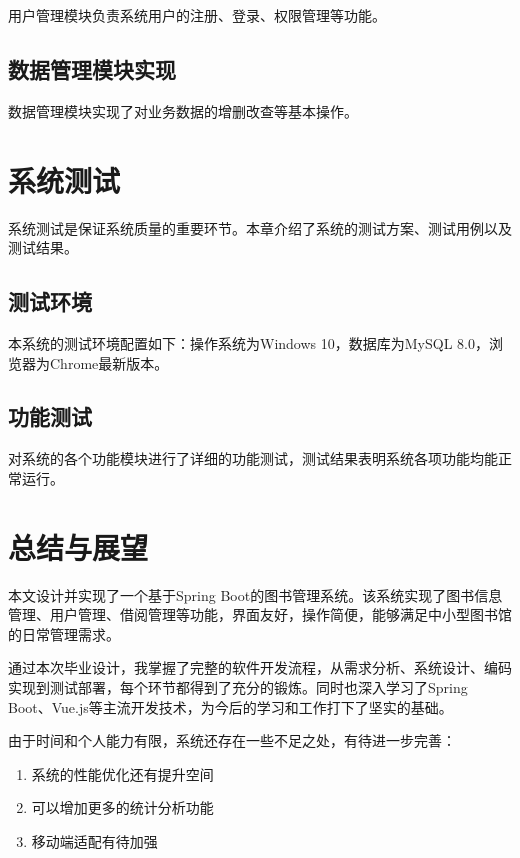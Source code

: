 \documentclass[a4paper,12pt,openany,twoside]{ctexbook}
\begin{document}
用户管理模块负责系统用户的注册、登录、权限管理等功能。

\section{数据管理模块实现}

数据管理模块实现了对业务数据的增删改查等基本操作。

\chapter{系统测试}

系统测试是保证系统质量的重要环节。本章介绍了系统的测试方案、测试用例以及测试结果。

\section{测试环境}

本系统的测试环境配置如下：操作系统为Windows 10，数据库为MySQL 8.0，浏览器为Chrome最新版本。

\section{功能测试}

对系统的各个功能模块进行了详细的功能测试，测试结果表明系统各项功能均能正常运行。

\chapter{总结与展望}

本文设计并实现了一个基于Spring Boot的图书管理系统。该系统实现了图书信息管理、用户管理、借阅管理等功能，界面友好，操作简便，能够满足中小型图书馆的日常管理需求。

通过本次毕业设计，我掌握了完整的软件开发流程，从需求分析、系统设计、编码实现到测试部署，每个环节都得到了充分的锻炼。同时也深入学习了Spring Boot、Vue.js等主流开发技术，为今后的学习和工作打下了坚实的基础。

由于时间和个人能力有限，系统还存在一些不足之处，有待进一步完善：

\begin{enumerate}[label=(\arabic*),leftmargin=2.5em,itemsep=0pt]
    \item 系统的性能优化还有提升空间
    \item 可以增加更多的统计分析功能
    \item 移动端适配有待加强
\end{enumerate}
\end{document}
